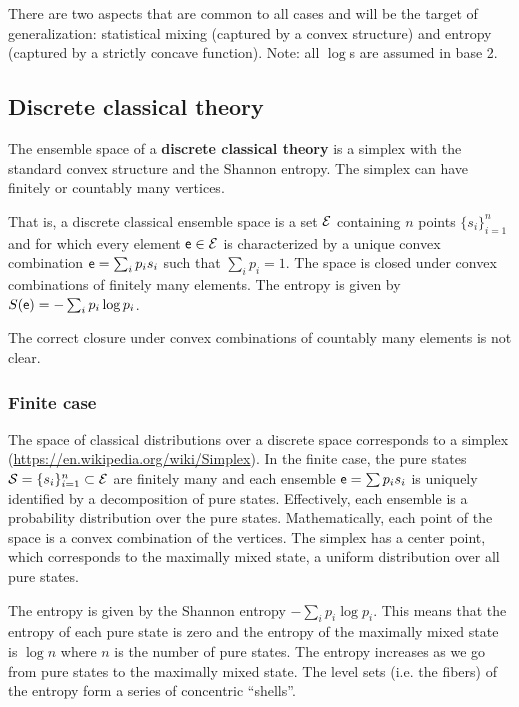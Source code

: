 There are two aspects that are common to all cases and will be the target of generalization: statistical mixing (captured by a convex structure) and entropy (captured by a strictly concave function). Note: all $\log$s are assumed in base 2.

\subsection{Discrete classical theory}

\begin{defn}
	The ensemble space of a \textbf{discrete classical theory} is a simplex with the standard convex structure and the Shannon entropy. The simplex can have finitely or countably many vertices.
	
	That is, a discrete classical ensemble space is a set $\mathcal{E}$ containing $n$ points $\{s_i\}^n_{i=1}$ and for which every element $\mathsf{e} \in \mathcal{E}$ is characterized by a unique convex combination $\mathsf{e} = \sum_i p_i s_i$ such that $\sum_i p_i = 1$. The space is closed under convex combinations of finitely many elements. The entropy is given by $S(\mathsf{e}) = - \sum_i p_i \log p_i$.
\end{defn}

\begin{remark}
	The correct closure under convex combinations of countably many elements is not clear.
\end{remark}

\subsubsection{Finite case}

The space of classical distributions over a discrete space corresponds to a simplex (\url{https://en.wikipedia.org/wiki/Simplex}). In the finite case, the pure states $\mathcal{S} = \{s_i\}_{i=1}^{n} \subset \mathcal{E}$ are finitely many and each ensemble $\mathsf{e} = \sum p_i s_i$ is uniquely identified by a decomposition of pure states. Effectively, each ensemble is a probability distribution over the pure states. Mathematically, each point of the space is a convex combination of the vertices. The simplex has a center point, which corresponds to the maximally mixed state, a uniform distribution over all pure states. 

The entropy is given by the Shannon entropy $-\sum_i p_i \log p_i$. This means that the entropy of each pure state is zero and the entropy of the maximally mixed state is $\log n$ where $n$ is the number of pure states. The entropy increases as we go from pure states to the maximally mixed state. The level sets (i.e. the fibers) of the entropy form a series of concentric ``shells''.

